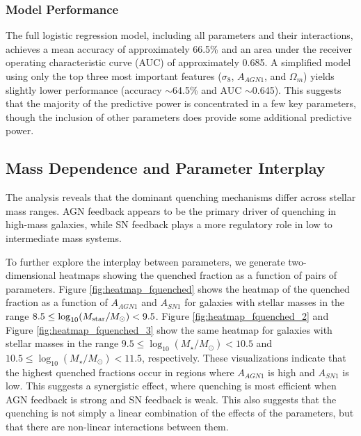 \documentclass[twocolumn]{aastex631}
\begin{document}
\subsubsection{Model Performance}

The full logistic regression model, including all parameters and their interactions, achieves a mean accuracy of approximately 66.5\% and an area under the receiver operating characteristic curve (AUC) of approximately 0.685. A simplified model using only the top three most important features (\(\sigma_8\), \(A_{AGN1}\), and \(\Omega_m\)) yields slightly lower performance (accuracy \(\sim\)64.5\% and AUC \(\sim\)0.645). This suggests that the majority of the predictive power is concentrated in a few key parameters, though the inclusion of other parameters does provide some additional predictive power.

\subsection{Mass Dependence and Parameter Interplay}

The analysis reveals that the dominant quenching mechanisms differ across stellar mass ranges. AGN feedback appears to be the primary driver of quenching in high-mass galaxies, while SN feedback plays a more regulatory role in low to intermediate mass systems.

To further explore the interplay between parameters, we generate two-dimensional heatmaps showing the quenched fraction as a function of pairs of parameters. Figure \ref{fig:heatmap_fquenched} shows the heatmap of the quenched fraction as a function of $A_{AGN1}$ and $A_{SN1}$ for galaxies with stellar masses in the range $8.5 \leq \log_{10}(M_{\rm star}/M_{\odot}) < 9.5$. Figure \ref{fig:heatmap_fquenched_2} and Figure \ref{fig:heatmap_fquenched_3} show the same heatmap for galaxies with stellar masses in the range $9.5 \leq \log_{10}(M_{\star}/M_{\odot}) < 10.5$ and $10.5 \leq \log_{10}(M_{\star}/M_{\odot}) < 11.5$, respectively. These visualizations indicate that the highest quenched fractions occur in regions where \(A_{AGN1}\) is high and \(A_{SN1}\) is low. This suggests a synergistic effect, where quenching is most efficient when AGN feedback is strong and SN feedback is weak. This also suggests that the quenching is not simply a linear combination of the effects of the parameters, but that there are non-linear interactions between them.
\end{document}
